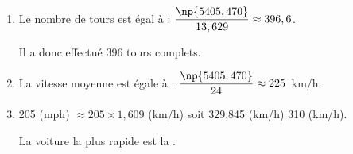 
\medskip

%
%
%
%
%
%
%
%
%

\begin{enumerate}
\item %
Le nombre de tours est égal à : $\dfrac{\np{5405,470}}{13,629} \approx 396,6$.

Il a donc effectué 396 tours complets.
\item %
La vitesse moyenne est égale à : $\dfrac{\np{5405,470}}{24} \approx 225$~km/h.
\item %

%

205 (mph) $\approx 205 \times 1,609$ (km/h) soit  329,845 (km/h)  310 (km/h).

La voiture la plus rapide est la .
\end{enumerate}

\vspace{0,5cm}


